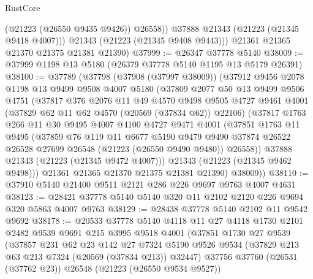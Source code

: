 \begin{lexlean}{RustCore}
\begin{coremodule}
              (@21223 (@26550 @9435 @9426))
              @26558))
          @37888
          @21343
          (@21223 (@21345 @9418 @4007)))
        @21343
        (@21223 (@21345 @9408 @9443)))
      @21361
      @21365
      @21370
      @21375
      @21381
      @21390)
@37999 := @26347 @37778 @5140
@38009 := @37999 @1198 @13 @5180 (@26379 @37778 @5140 @1195 @13 @5179 @26391)
@38100 := @37789
    (@37798
      (@37908 (@37997 @38009))
      (@37912
        @9456
        @2078
        @1198
        @13
        @9499
        @9508
        @4007
        @5180
        (@37809
          @2077
          @50
          @13
          @9499
          @9506
          @4751
          (@37817
            @376
            @2076
            @11
            @49
            @4570
            @9498
            @9505
            @4727
            @9461
            @4001
            (@37829 @62 @11 @62 @4570 (@20569 (@37834 @62)) @22106)
            (@37817
              @1763
              @266
              @11
              @30
              @9495
              @4007
              @4100
              @4727
              @9471
              @4001
              (@37851
                @1763
                @11
                @9495
                (@37859
                  @76
                  @119
                  @11
                  @6677
                  @5190
                  @9479
                  @9490
                  @37874
                  @26522
                  @26528
                  @27699
                  @26548
                  (@21223 (@26550 @9490 @9480))
                  @26558))
              @37888
              @21343
              (@21223 (@21345 @9472 @4007)))
            @21343
            (@21223 (@21345 @9462 @9498)))
          @21361
          @21365
          @21370
          @21375
          @21381
          @21390)
        @38009))
@38110 := @37910 @5140 @21400 @9511 @2121 @286 @226 @9697 @9763 @4007 @4631
@38123 := @28421 @37778 @5140 @5140 @320 @11 @2102 @2120 @226 @9694 @320 @5863 @4007 @9763
@38129 := @28438 @37778 @5140 @2102 @11 @9542 @9692
@38178 := @20533
    @37778
    @5140
    @4118
    @11
    @27
    @4118
    @1730
    @2101
    @2482
    @9539
    @9691
    @215
    @3995
    @9518
    @4001
    (@37851
      @1730
      @27
      @9539
      (@37857
        @231
        @62
        @23
        @142
        @27
        @7324
        @5190
        @9526
        @9534
        (@37829 @213 @63 @213 @7324 (@20569 (@37834 @213)) @32447)
        @37756
        @37760
        (@26531 (@37762 @23))
        @26548
        (@21223 (@26550 @9534 @9527))

\end{coremodule}
\end{lexlean}
